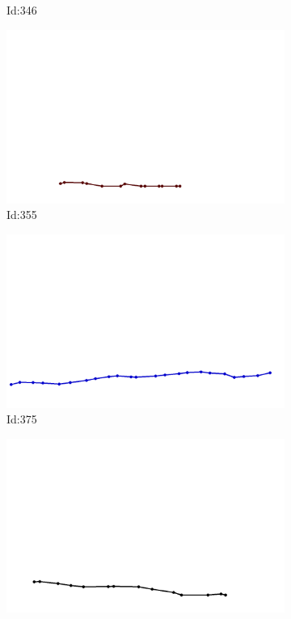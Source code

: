 \documentclass[12pt,twoside]{report}
\begin{document}
\begin{figure}
\begin{subfigure}[b]{0.20\textwidth}
\caption{Id:346}
\end{subfigure}
\begin{subfigure}[b]{0.20\textwidth}
\centering
\includegraphics[width=\textwidth]{../trajectories/355.png}
\caption{Id:355}
\end{subfigure}
\begin{subfigure}[b]{0.20\textwidth}
\centering
\includegraphics[width=\textwidth]{../trajectories/375.png}
\caption{Id:375}
\end{subfigure}
\begin{subfigure}[b]{0.20\textwidth}
\centering
\includegraphics[width=\textwidth]{../trajectories/378.png}

\end{subfigure}
\end{figure}
\end{document}
